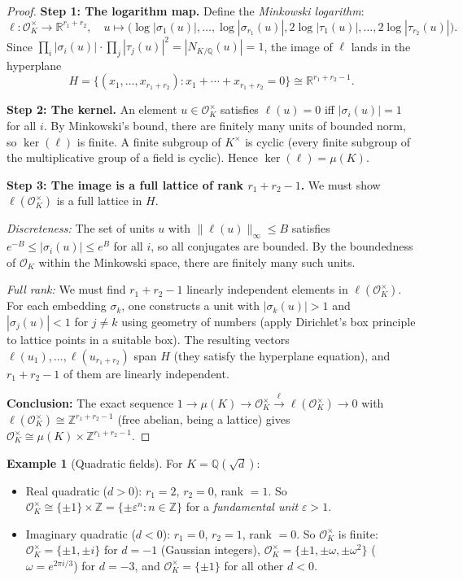 \documentclass[12pt,a4paper]{amsart}
\theoremstyle{definition}
\newtheorem{example}[theorem]{Example}
\newcommand{\Z}{\mathbb{Z}}
\newcommand{\Q}{\mathbb{Q}}
\newcommand{\R}{\mathbb{R}}
\newcommand{\OK}{\mathcal{O}_K}
\begin{document}
\begin{proof}
\textbf{Step 1: The logarithm map.}
Define the \emph{Minkowski logarithm}:
\[
  \ell : \OK^\times \longrightarrow \R^{r_1+r_2},
  \quad
  u \mapsto \bigl(\log|\sigma_1(u)|, \ldots, \log|\sigma_{r_1}(u)|,
               2\log|\tau_1(u)|, \ldots, 2\log|\tau_{r_2}(u)|\bigr).
\]
Since $\prod_i |\sigma_i(u)|^{} \cdot \prod_j |\tau_j(u)|^2 = |N_{K/\Q}(u)| = 1$,
the image of $\ell$ lands in the hyperplane
\[
  H = \bigl\{(x_1,\ldots,x_{r_1+r_2}) : x_1 + \cdots + x_{r_1+r_2} = 0\bigr\}
  \cong \R^{r_1+r_2-1}.
\]

\textbf{Step 2: The kernel.}
An element $u \in \OK^\times$ satisfies $\ell(u) = 0$ iff $|\sigma_i(u)| = 1$
for all $i$.  By Minkowski's bound, there are finitely many units of bounded norm,
so $\ker(\ell)$ is finite.  A finite subgroup of $K^\times$ is cyclic (every finite
subgroup of the multiplicative group of a field is cyclic).  Hence $\ker(\ell) = \mu(K)$.

\textbf{Step 3: The image is a full lattice of rank $r_1+r_2-1$.}
We must show $\ell(\OK^\times)$ is a full lattice in $H$.

\emph{Discreteness:}  The set of units $u$ with $\|\ell(u)\|_\infty \le B$
satisfies $e^{-B} \le |\sigma_i(u)| \le e^B$ for all $i$, so all
conjugates are bounded.  By the boundedness of $\OK$ within the Minkowski
space, there are finitely many such units.

\emph{Full rank:}  We must find $r_1+r_2-1$ linearly independent elements
in $\ell(\OK^\times)$.  For each embedding $\sigma_k$, one constructs a unit
with $|\sigma_k(u)| > 1$ and $|\sigma_j(u)| < 1$ for $j \ne k$ using
geometry of numbers (apply Dirichlet's box principle to lattice points in
a suitable box).  The resulting vectors $\ell(u_1), \ldots, \ell(u_{r_1+r_2})$
span $H$ (they satisfy the hyperplane equation), and $r_1+r_2-1$ of them
are linearly independent.

\textbf{Conclusion:}  The exact sequence
$1 \to \mu(K) \to \OK^\times \xrightarrow{\ell} \ell(\OK^\times) \to 0$
with $\ell(\OK^\times) \cong \Z^{r_1+r_2-1}$ (free abelian, being a lattice)
gives $\OK^\times \cong \mu(K) \times \Z^{r_1+r_2-1}$.
\end{proof}

\begin{example}[Quadratic fields]
For $K = \Q(\sqrt{d})$:
\begin{itemize}
  \item Real quadratic ($d > 0$): $r_1 = 2$, $r_2 = 0$, rank $= 1$.
    So $\OK^\times \cong \{\pm 1\} \times \Z = \{\pm \varepsilon^n : n \in \Z\}$
    for a \emph{fundamental unit} $\varepsilon > 1$.
  \item Imaginary quadratic ($d < 0$): $r_1 = 0$, $r_2 = 1$, rank $= 0$.
    So $\OK^\times$ is finite:
    $\OK^\times = \{\pm 1, \pm i\}$ for $d=-1$ (Gaussian integers),
    $\OK^\times = \{\pm 1, \pm\omega, \pm\omega^2\}$ ($\omega = e^{2\pi i/3}$)
    for $d=-3$, and $\OK^\times = \{\pm 1\}$ for all other $d < 0$.
\end{itemize}
\end{example}
\end{document}
